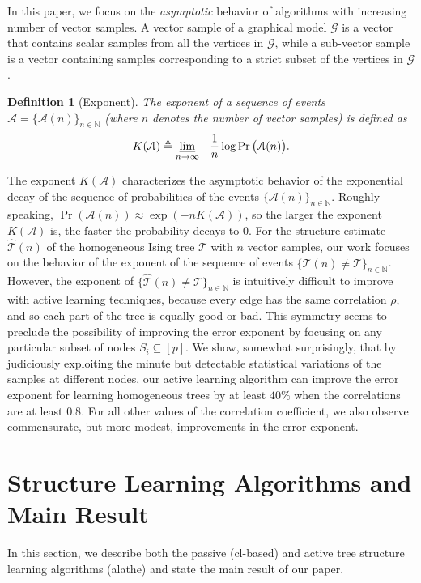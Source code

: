 \documentclass[11pt,onecolumn]{article}
\newcommand{\calA}{\mathcal{A}}
\newcommand{\calG}{\mathcal{G}}
\newcommand{\calT}{\mathcal{T}}
\newcommand{\hatcalT}{\hat{\calT}}
\newcommand{\bbN}{\mathbb{N}}
\newtheorem{definition}{Definition}
\begin{document}
In this paper, we focus on the \emph{asymptotic} behavior  of algorithms with   increasing number of vector samples. A vector sample of a graphical model $\calG$ is a vector that contains scalar samples from  all the vertices in $\calG$, while a 
sub-vector sample is a vector containing samples corresponding to a strict subset of the vertices in $\calG$. %
\begin{definition}[Exponent]
	The exponent of a sequence of events $\calA=\{\calA(n)\}_{n\in\bbN}$ (where $n$ denotes the number of vector samples) is defined as
	\begin{align}
		K(\calA)\triangleq \varliminf_{n\rightarrow \infty}-\frac{1}{n}\log\Pr\big(\calA(n)\big).
	\end{align}
\end{definition}
The exponent $K(\calA)$ characterizes the asymptotic behavior of the exponential decay of the sequence of  probabilities of the events $\{\calA (n)\}_{n\in\bbN}$. Roughly speaking, 
$\Pr(\calA(n))\approx \exp (-n K(\calA) )$, 
so the larger the exponent $K(\calA)$ is, the faster the   probability decays to $0$.
For the structure estimate $\hatcalT(n)$ of the homogeneous Ising tree $\calT$ with $n$ vector samples, our work focuses on the behavior of the exponent of the sequence of events $\{\hatcalT(n)\neq \calT\}_{n\in\bbN}$. However, the exponent of $\{\hatcalT(n)\neq \calT\}_{n\in\bbN}$ is intuitively difficult to improve with active learning techniques, because every edge has the same correlation $\rho$, and so each part of the tree is equally good or bad. This   symmetry seems to preclude the possibility of improving the error exponent by focusing on any   particular subset of nodes $S_{i} \subseteq[p]$. We show, somewhat surprisingly,
that by judiciously exploiting the minute but detectable statistical variations of the samples at
different nodes, our active learning algorithm can improve the error exponent for learning homogeneous trees by at least $40\%$
when the correlations are at least $0.8$. For all other values of the correlation coefficient, we also
observe commensurate, but more modest, improvements in the error exponent.

\section{Structure Learning Algorithms and Main Result} \label{sec:structure}
In this section, we describe both the passive (\ac{cl}-based) and active tree structure learning algorithms  (\ac{alathe}) and state the main result of our paper.
\end{document}

